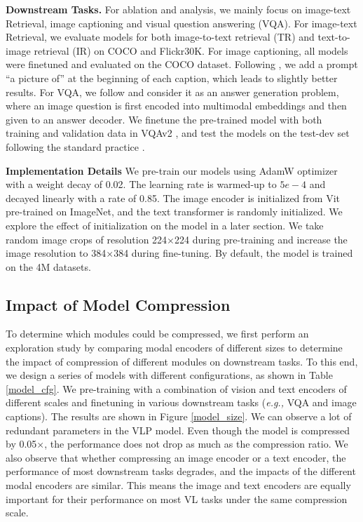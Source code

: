 \documentclass[10pt,twocolumn,letterpaper]{article}
\begin{document}
\vspace{0.4em}
\par
\noindent
\textbf{Downstream Tasks.}
For ablation and analysis, we mainly focus on image-text Retrieval, image captioning  and visual question answering (VQA).  
For image-text Retrieval, we evaluate models for both image-to-text retrieval (TR) and text-to-image retrieval (IR) on COCO and Flickr30K.
For image captioning, all models were finetuned and evaluated on the COCO dataset. Following \cite{wang2021simvlm, li2022blip}, we add a prompt “a picture of” at the beginning of each caption, which leads to slightly better results.
For VQA, we follow \cite{li2021align,li2022blip} and consider it as an answer generation problem, where an image question is first encoded into multimodal embeddings and then given to an answer decoder.
We finetune the pre-trained model with both training and validation data in VQAv2 \cite{antol2015vqa}, and test the models on the test-dev set following the standard practice \cite{chen2020uniter}.

\vspace{0.4em}
\par
\noindent
\textbf{Implementation Details}
We pre-train our models using AdamW \cite{loshchilov2017decoupled} optimizer with a weight decay of 0.02. The learning rate is warmed-up to $5e-4$ and decayed linearly with a rate of 0.85. The image encoder is initialized from Vit pre-trained on ImageNet, and the text transformer is randomly initialized. We explore the effect of initialization on the model in a later section. We take random image crops of resolution 224$\times$224 during pre-training and increase the image resolution to 384$\times$384 during fine-tuning. By default, the model is trained on the 4M datasets.



\subsection{Impact of Model Compression}
To determine which modules could be compressed, we first perform an exploration study by comparing modal encoders of different sizes to determine the impact of compression of different modules on downstream tasks.
To this end, we design a series of models with different configurations, as shown in Table \ref{model_cfg}.
We pre-training with a combination of vision and text encoders of different scales and finetuning in various downstream tasks (\emph{e.g.,} VQA and image captions). 
The results are shown in Figure \ref{model_size}.
We can observe a lot of redundant parameters in the VLP model. 
Even though the model is compressed by 0.05$\times$, the performance does not drop as much as the compression ratio. 
We also observe that whether compressing an image encoder or a text encoder, the performance of most downstream tasks degrades, and the impacts of the different modal encoders are similar.
This means the image and text encoders are equally important for their performance on most VL tasks under the same compression scale.
\end{document}

